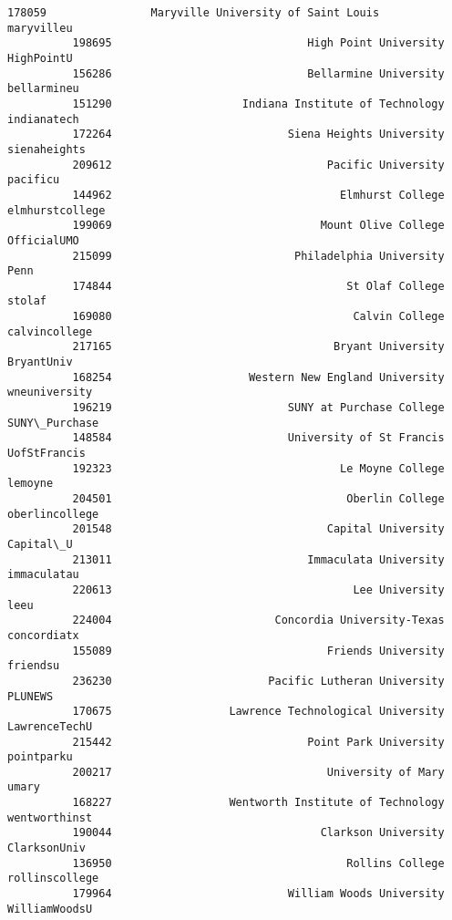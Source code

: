 \documentclass[11pt]{article}
\begin{document}
\begin{Verbatim}[commandchars=\\\{\}]
          178059                Maryville University of Saint Louis       maryvilleu   
          198695                              High Point University       HighPointU   
          156286                              Bellarmine University      bellarmineu   
          151290                    Indiana Institute of Technology      indianatech   
          172264                           Siena Heights University     sienaheights   
          209612                                 Pacific University         pacificu   
          144962                                   Elmhurst College  elmhurstcollege   
          199069                                Mount Olive College      OfficialUMO   
          215099                            Philadelphia University             Penn   
          174844                                    St Olaf College           stolaf   
          169080                                     Calvin College    calvincollege   
          217165                                  Bryant University       BryantUniv   
          168254                     Western New England University    wneuniversity   
          196219                           SUNY at Purchase College    SUNY\_Purchase   
          148584                           University of St Francis     UofStFrancis   
          192323                                   Le Moyne College          lemoyne   
          204501                                    Oberlin College   oberlincollege   
          201548                                 Capital University        Capital\_U   
          213011                              Immaculata University      immaculatau   
          220613                                     Lee University             leeu   
          224004                         Concordia University-Texas      concordiatx   
          155089                                 Friends University         friendsu   
          236230                        Pacific Lutheran University          PLUNEWS   
          170675                  Lawrence Technological University    LawrenceTechU   
          215442                              Point Park University       pointparku   
          200217                                 University of Mary            umary   
          168227                  Wentworth Institute of Technology    wentworthinst   
          190044                                Clarkson University     ClarksonUniv   
          136950                                    Rollins College   rollinscollege   
          179964                           William Woods University    WilliamWoodsU   

\end{Verbatim}
\end{document}
